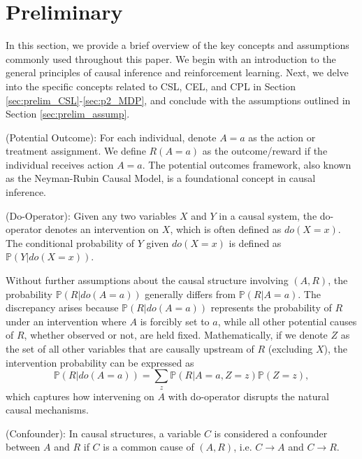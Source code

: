 \section{Preliminary} \label{sec:preliminary}
In this section, we provide a brief overview of the key concepts and assumptions commonly used throughout this paper. We begin with an introduction to the general principles of causal inference and reinforcement learning. Next, we delve into the specific concepts related to \acrshort{CSL}, \acrshort{CEL}, and \acrshort{CPL} in Section \ref{sec:prelim_CSL}-\ref{sec:p2_MDP}, and conclude with the assumptions outlined in Section \ref{sec:prelim_assump}.

\begin{definition} (Potential Outcome): For each individual, denote $A=a$ as the action or treatment assignment. We define $R(A=a)$ as the outcome/reward if the individual receives action $A=a$.
The potential outcomes framework, also known as the Neyman-Rubin Causal Model, is a foundational concept in causal inference.
\end{definition} 

\begin{definition}(Do-Operator): Given any two variables $X$ and $Y$ in a causal system, the do-operator denotes an intervention on $X$, which is often defined as $do(X=x)$. The conditional probability of $Y$ given $do(X=x)$ is defined as $\mathbb{P}(Y|do(X=x))$.
\end{definition}
Without further assumptions about the causal structure involving $(A,R)$, the probability $\mathbb{P}(R|do(A=a))$ generally differs from $\mathbb{P}(R|A=a)$. The discrepancy arises because $\mathbb{P}(R|do(A=a))$ represents the probability of $R$ under an intervention where $A$ is forcibly set to $a$, while all other potential causes of $R$, whether observed or not, are held fixed. Mathematically, if we denote $Z$ as the set of all other variables that are causally upstream of $R$ (excluding $X$), the intervention probability can be expressed as
$$
\mathbb{P}(R|do(A=a)) = \sum_z \mathbb{P}(R|A=a,Z=z)\mathbb{P}(Z=z),
$$
which captures how intervening on $A$ with do-operator disrupts the natural causal mechanisms.
\begin{definition}(Confounder): In causal structures, a variable $C$ is considered a confounder between $A$ and $R$ if $C$ is a common cause of $(A,R)$, i.e. $C\rightarrow A$ and $C\rightarrow R$.
    
\end{definition}

